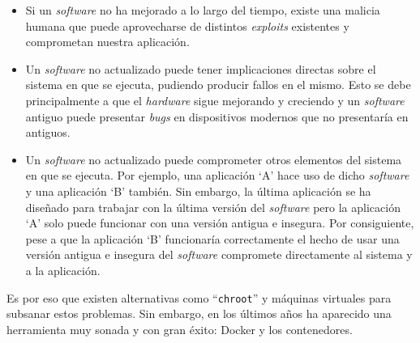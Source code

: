 \begin{itemize}
    \item Si un \textit{software} no ha mejorado a lo largo del tiempo, existe una
          malicia humana que puede aprovecharse de distintos \textit{exploits}
          existentes y comprometan nuestra aplicación.
    \item Un \textit{software} no actualizado puede tener implicaciones directas
          sobre el sistema en que se ejecuta, pudiendo producir fallos en el mismo.
          Esto se debe principalmente a que el \textit{hardware} sigue mejorando y
          creciendo y un \textit{software} antiguo puede presentar \textit{bugs}
          en dispositivos modernos que no presentaría en antiguos.
    \item Un \textit{software} no actualizado puede comprometer otros elementos del
          sistema en que se ejecuta. Por ejemplo, una aplicación `A' hace uso de dicho \textit{software}
          y una aplicación `B' también. Sin embargo, la última aplicación se ha diseñado
          para trabajar con la última versión del \textit{software} pero la aplicación
          `A' solo puede funcionar con una versión antigua e insegura. Por consiguiente,
          pese a que la aplicación `B' funcionaría correctamente el hecho de usar una
          versión antigua e insegura del \textit{software} compromete directamente al
          sistema y a la aplicación.
\end{itemize}

Es por eso que existen alternativas como ``\texttt{chroot}'' y máquinas virtuales para
subsanar estos problemas. Sin embargo, en los últimos años ha aparecido una herramienta
muy sonada y con gran éxito: Docker y los contenedores.
